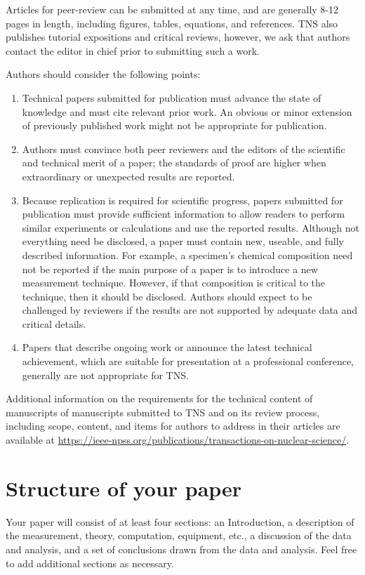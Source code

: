 \documentclass{IEEEtran}
\begin{document}
Articles for peer-review can be submitted at any time, and are generally 8-12 
pages in length, including figures, tables, equations, and references. TNS
also publishes tutorial expositions and critical reviews, however, we ask
that authors contact the editor in chief prior to submitting such a work.

Authors should consider the following points:

\begin{enumerate}
\item Technical papers submitted for publication must advance the state of knowledge and must cite relevant prior work. An obvious or minor extension of previously published work might not be appropriate for publication.
\item Authors must convince both peer reviewers and the editors of the scientific and technical merit of a paper; the standards of proof are higher when extraordinary or unexpected results are reported.
\item Because replication is required for scientific progress, papers submitted for publication must provide sufficient information to allow readers to perform similar experiments or calculations and use the reported results. Although not everything need be disclosed, a paper must contain new, useable, and fully described information. For example, a specimen's chemical composition need not be reported if the main purpose of a paper is to introduce a new measurement technique. However, if that composition is critical to the technique, then it should be disclosed. Authors should expect to be challenged by reviewers if the results are not supported by adequate data and critical details.
\item Papers that describe ongoing work or announce the latest technical achievement, which are suitable for presentation at a professional conference, generally are not appropriate for TNS.
\end{enumerate}

Additional information on the requirements for the technical content of
manuscripts of manuscripts submitted to TNS and on its review process,
including scope, content, and items for authors to address in their articles
are available at \underline
{https://}\discretionary{}{}{}\underline{ieee-npss.org/publications/transactions-on-nuclear-science/}.

\section{Structure of your paper}
Your paper will consist of at least four sections: an Introduction, a
description of the measurement, theory, computation, equipment, etc., a
discussion of the data and analysis, and a set of conclusions drawn from the
data and analysis. Feel free to add additional sections as necessary.
\end{document}
